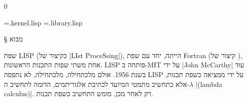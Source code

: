 \def\CPL{\E|C|\xspace}

\setcounter{library}0

\newread \tempFile %
\newwrite {} %
\newwrite \libraryFile %
\immediate \openout {}=\jobname.kernel.lisp
\immediate \openout \libraryFile=\jobname.library.lisp

\newenvironment{KERNEL}{%
  \stepcounter{kernel}
  \def\fileName{\jobname.kernel.\arabic{kernel}.lisp}%
  \global\let\savedifeof=\ifeof
  \def\ifeof##1{\global\let\ifeof=\savedifeof\iftrue}%
  \csname filecontents*\endcsname{\fileName}%
}{%
  \csname endfilecontents*\endcsname%
  \pagebreak[3]%
  \LTR
  \endLTR
  \pagebreak[3]%
  \openin\tempFile=\fileName
  \begingroup\endlinechar=-1%
  \loop\unless\ifeof \tempFile
  \read\tempFile to\fileline %
  \immediate\write\kernelFile {\unexpanded\expandafter{\fileline}}%
  \repeat
  \immediate\write \kernelFile {¢}%
  \immediate\write \kernelFile {\unexpanded\expandafter{\pagebreak}[3]}%
  \immediate\write \kernelFile {¢}%
  \endgroup
  \closein \tempFile
}

\newenvironment{LIBRARY}{%
  \stepcounter{library}
  \def\fileName{\jobname.library.\arabic{library}.lisp}%
  \global\let\savedifeof=\ifeof
  \def\ifeof##1{\global\let\ifeof=\savedifeof\iftrue}%
  \csname filecontents*\endcsname{\fileName}%
}{%
  \csname endfilecontents*\endcsname%
  \pagebreak[3]%
  \LTR
  \endLTR
  \pagebreak[3]%
  \newread \tempFile %
  \openin \tempFile=\fileName
  \begingroup\endlinechar=-1
  \loop\unless\ifeof \tempFile
  \read\tempFile to\fileline %
  \immediate\write \libraryFile
  {\unexpanded\expandafter{\fileline}} %
  \repeat
  \endgroup
  \closein \tempFile
}%

§ מבוא

שפת LISP (כקיצור של \E|LIst ProceSsing|), הייתה, יחד עם שפת Fortran (קיצור של
), אחת משתי שפות התכנות הראשונות. LISP פותחה ב-MIT על
ידי \E|John McCarthy| עוד בשנת 1956. אולם מלכתחילה, מלכתחילה, לא נתפסה LISP
על ידי ממציאה כשפת תכנות, אלא כתחשיב מתמטי המיועד לכתיבת אלגוריתמים,
הדומה לתחשיב ה-$λ$ \E|(lambda calculus)|. רק לאחר מכן, מומש התחשיב כשפת תכנות.

